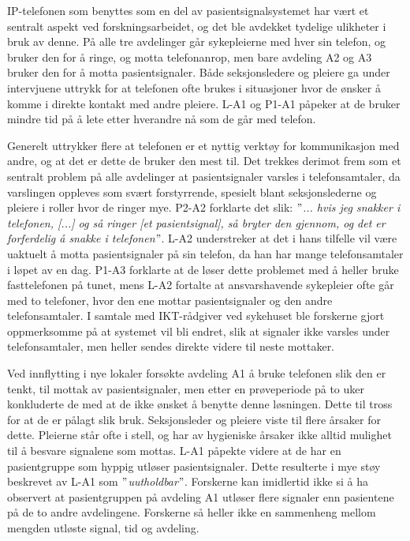 \noindent
IP-telefonen som benyttes som en del av pasientsignalsystemet har vært et sentralt aspekt ved forskningsarbeidet, og det ble avdekket tydelige ulikheter i bruk av denne. På alle tre avdelinger går sykepleierne med hver sin telefon, og bruker den for å ringe, og motta telefonanrop, men bare avdeling A2 og A3 bruker den for å motta pasientsignaler. Både seksjonsledere og pleiere ga under intervjuene uttrykk for at telefonen ofte brukes i situasjoner hvor de ønsker å komme i direkte kontakt med andre pleiere. L-A1 og P1-A1 påpeker at de bruker mindre tid på å lete etter hverandre nå som de går med telefon.   

\noindent
Generelt uttrykker flere at telefonen er et nyttig verktøy for kommunikasjon med andre, og at det er dette de bruker den mest til. Det trekkes derimot frem som et sentralt problem på alle avdelinger at pasientsignaler varsles i telefonsamtaler, da varslingen oppleves som svært forstyrrende, spesielt blant seksjonslederne og pleiere i roller hvor de ringer mye. P2-A2 forklarte det slik: \textit{ $"$... hvis jeg snakker i telefonen, [...] og så ringer [et pasientsignal], så bryter den gjennom, og det er forferdelig å snakke i telefonen$"$}. L-A2 understreker at det i hans tilfelle vil være uaktuelt å motta pasientsignaler på sin telefon, da han har mange telefonsamtaler i løpet av en dag. P1-A3 forklarte at de løser dette problemet med å heller bruke fasttelefonen på tunet, mens L-A2 fortalte at ansvarshavende sykepleier ofte går med to telefoner, hvor den ene mottar pasientsignaler og den andre telefonsamtaler. I samtale med IKT-rådgiver ved sykehuset ble forskerne gjort oppmerksomme på at systemet vil bli endret, slik at signaler ikke varsles under telefonsamtaler, men heller sendes direkte videre til neste mottaker.

\noindent
Ved innflytting i nye lokaler forsøkte avdeling A1 å bruke telefonen slik den er tenkt, til mottak av pasientsignaler, men etter en prøveperiode på to uker konkluderte de med at de ikke ønsket å benytte denne løsningen. Dette til tross for at de er pålagt slik bruk. Seksjonsleder og pleiere viste til flere årsaker for dette. Pleierne står ofte i stell, og har av hygieniske årsaker ikke alltid mulighet til å besvare signalene som mottas. L-A1 påpekte videre at de har en pasientgruppe som hyppig utløser pasientsignaler. Dette resulterte i mye støy beskrevet av L-A1 som \textit{$"$uutholdbar$"$}. Forskerne kan imidlertid ikke si å ha observert at pasientgruppen på avdeling A1 utløser flere signaler enn pasientene på de to andre avdelingene. Forskerne så heller ikke en sammenheng mellom mengden utløste signal, tid og avdeling. 

